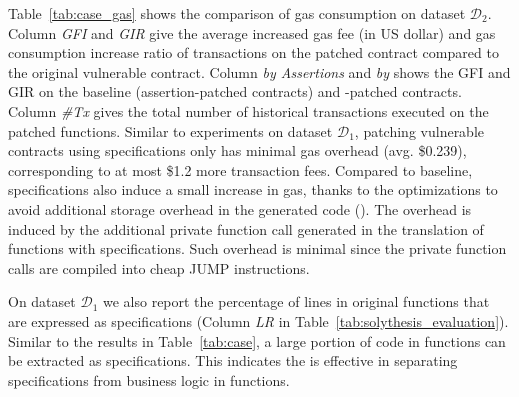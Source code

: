 Table~\ref{tab:case_gas} shows the comparison of gas consumption on dataset $\mathcal{D}_2$.
Column \textit{GFI} and \textit{GIR} give the average increased gas fee (in US dollar) and gas consumption increase ratio of transactions on the patched contract compared to the original vulnerable contract.
Column \textit{by Assertions} and \textit{by \lang} shows the GFI and GIR on the baseline (assertion-patched contracts) and \lang-patched contracts.
Column \textit{\#Tx} gives the total number of historical transactions executed on the patched functions.
Similar to experiments on dataset $\mathcal{D}_1$, patching vulnerable contracts using \lang specifications only has minimal gas overhead (avg. \$0.239), corresponding to at most \$1.2 more transaction fees.
Compared to baseline, \lang specifications also induce a small increase in gas, thanks to the optimizations to avoid additional storage overhead in the generated code ().
The overhead is induced by the additional private function call generated in the translation of functions with \lang specifications.
Such overhead is minimal since the private function calls are compiled into cheap JUMP instructions.

On dataset $\mathcal{D}_1$ we also report the percentage of lines in original functions that are expressed as \lang specifications (Column \textit{LR} in Table~\ref{tab:solythesis_evaluation}).
Similar to the results in Table~\ref{tab:case}, a large portion of code in functions can be extracted as \lang specifications.
This indicates the \lang is effective in separating specifications from business logic in functions.



